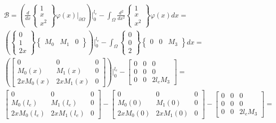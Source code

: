 \begin{tcolorbox}[breakable, colback=white, colframe=black, boxrule=0.4pt, arc=0pt, outer arc=0pt]
\begin{enumerate}[label=\alph*), leftmargin=*]
            $$\begin{aligned} \mathcal{B} = \left(\frac{d}{dx} \begin{Bmatrix} 1 \\ x \\ x^2 \end{Bmatrix}\varphi(x)\Big|_{\partial \Omega}\right)\Big|_{0}^{l_e} - \int_{\Omega} \frac{d^2}{dx^2}\begin{Bmatrix} 1 \\ x \\ x^2 \end{Bmatrix} \varphi(x) dx = \\
            \left( \begin{Bmatrix} 0 \\ 1 \\ 2x \end{Bmatrix}\begin{Bmatrix} M_0 & M_1 & 0 \end{Bmatrix}\right)\Big|_{0}^{l_e} - \int_{\Omega} \begin{Bmatrix} 0 \\ 0 \\ 2 \end{Bmatrix}\begin{Bmatrix} 0 & 0 & M_3 \end{Bmatrix} dx = \\
            \left( \begin{bmatrix} 0 & 0 & 0 \\ M_0(x) & M_1(x) & 0 \\ 2xM_0(x) & 2xM_1(x) & 0 \end{bmatrix}\right)\Big|_{0}^{l_e} - \begin{bmatrix} 0 & 0 & 0 \\ 0 & 0 & 0 \\ 0 & 0 & 2l_e M_3 \end{bmatrix} = \\
            \begin{bmatrix} 0 & 0 & 0 \\ M_0(l_e) & M_1(l_e) & 0 \\ 2xM_0(l_e) & 2xM_1(l_e) & 0  \end{bmatrix} - \begin{bmatrix} 0 & 0 & 0 \\ M_0(0) & M_1(0) & 0 \\ 2xM_0(0) & 2xM_1(0) & 0  \end{bmatrix} - \begin{bmatrix} 0 & 0 & 0 \\ 0 & 0 & 0 \\ 0 & 0 & 2l_e M_3 \end{bmatrix} = \\

\end{aligned}$$
\end{enumerate}
\end{tcolorbox}
